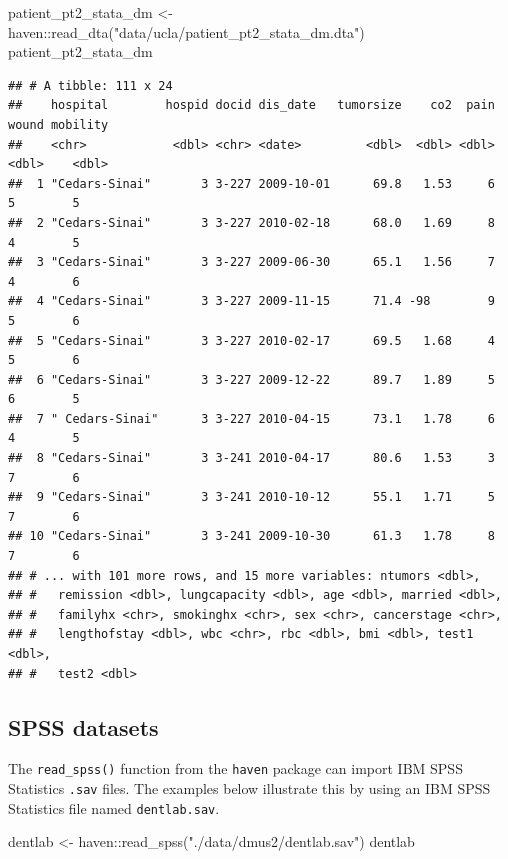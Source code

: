\documentclass[
]{book}
\newenvironment{Shaded}{\begin{snugshade}}{\end{snugshade}}
\newcommand{\FunctionTok}[1]{\textcolor[rgb]{0.00,0.00,0.00}{#1}}
\newcommand{\NormalTok}[1]{#1}
\newcommand{\OtherTok}[1]{\textcolor[rgb]{0.56,0.35,0.01}{#1}}
\newcommand{\SpecialCharTok}[1]{\textcolor[rgb]{0.00,0.00,0.00}{#1}}
\newcommand{\StringTok}[1]{\textcolor[rgb]{0.31,0.60,0.02}{#1}}
\begin{document}
\begin{Shaded}
\begin{Highlighting}[]
\NormalTok{patient\_pt2\_stata\_dm }\OtherTok{\textless{}{-}}\NormalTok{ haven}\SpecialCharTok{::}\FunctionTok{read\_dta}\NormalTok{(}\StringTok{"data/ucla/patient\_pt2\_stata\_dm.dta"}\NormalTok{)}
\NormalTok{patient\_pt2\_stata\_dm}
\end{Highlighting}
\end{Shaded}

\begin{verbatim}
## # A tibble: 111 x 24
##    hospital        hospid docid dis_date   tumorsize    co2  pain wound mobility
##    <chr>            <dbl> <chr> <date>         <dbl>  <dbl> <dbl> <dbl>    <dbl>
##  1 "Cedars-Sinai"       3 3-227 2009-10-01      69.8   1.53     6     5        5
##  2 "Cedars-Sinai"       3 3-227 2010-02-18      68.0   1.69     8     4        5
##  3 "Cedars-Sinai"       3 3-227 2009-06-30      65.1   1.56     7     4        6
##  4 "Cedars-Sinai"       3 3-227 2009-11-15      71.4 -98        9     5        6
##  5 "Cedars-Sinai"       3 3-227 2010-02-17      69.5   1.68     4     5        6
##  6 "Cedars-Sinai"       3 3-227 2009-12-22      89.7   1.89     5     6        5
##  7 " Cedars-Sinai"      3 3-227 2010-04-15      73.1   1.78     6     4        5
##  8 "Cedars-Sinai"       3 3-241 2010-04-17      80.6   1.53     3     7        6
##  9 "Cedars-Sinai"       3 3-241 2010-10-12      55.1   1.71     5     7        6
## 10 "Cedars-Sinai"       3 3-241 2009-10-30      61.3   1.78     8     7        6
## # ... with 101 more rows, and 15 more variables: ntumors <dbl>,
## #   remission <dbl>, lungcapacity <dbl>, age <dbl>, married <dbl>,
## #   familyhx <chr>, smokinghx <chr>, sex <chr>, cancerstage <chr>,
## #   lengthofstay <dbl>, wbc <chr>, rbc <dbl>, bmi <dbl>, test1 <dbl>,
## #   test2 <dbl>
\end{verbatim}

\hypertarget{spss-datasets}{%
\subsection{SPSS datasets}\label{spss-datasets}}

The \texttt{read\_spss()} function from the \texttt{haven} package can import IBM SPSS Statistics \texttt{.sav} files. The examples below illustrate this by using an IBM SPSS Statistics file named \texttt{dentlab.sav}.

\begin{Shaded}
\begin{Highlighting}[]
\NormalTok{dentlab }\OtherTok{\textless{}{-}}\NormalTok{ haven}\SpecialCharTok{::}\FunctionTok{read\_spss}\NormalTok{(}\StringTok{"./data/dmus2/dentlab.sav"}\NormalTok{)}
\NormalTok{dentlab}
\end{Highlighting}
\end{Shaded}
\end{document}

